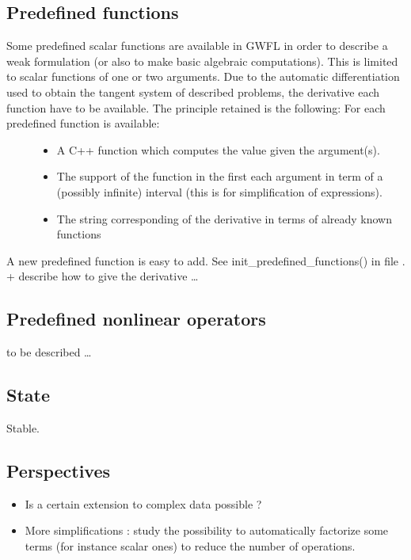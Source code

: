 \documentclass[a4paper,11pt,english]{sphinxmanual}
\begin{document}
\subsection{Predefined functions}
\label{\detokenize{project/libdesc_high_gen_assemb:predefined-functions}}\begin{description}
\item[{Some predefined scalar functions are available in GWFL in order to describe a weak formulation (or also to make basic algebraic computations). This is limited to scalar functions of one or two arguments. Due to the automatic differentiation used to obtain the tangent system of described problems, the derivative each function have to be available. The principle retained is the following: For each predefined function is available:}] \leavevmode\begin{itemize}
\item {} 
A C++ function which computes the value given the argument(s).

\item {} 
The support of the function in the first each argument in term of a
(possibly infinite) interval (this is for simplification of expressions).

\item {} 
The string corresponding of the derivative in terms of already known
functions

\end{itemize}

\end{description}

A new predefined function is easy to add. See init\_predefined\_functions() in file . + describe how to give the derivative …


\subsection{Predefined nonlinear operators}
\label{\detokenize{project/libdesc_high_gen_assemb:predefined-nonlinear-operators}}
to be described …


\subsection{State}
\label{\detokenize{project/libdesc_high_gen_assemb:state}}
Stable.


\subsection{Perspectives}
\label{\detokenize{project/libdesc_high_gen_assemb:perspectives}}\begin{itemize}
\item {} 
Is a certain extension to complex data possible ?

\item {} 
More simplifications : study the possibility to automatically factorize some terms (for instance scalar ones) to reduce the number of operations.

\end{itemize}
\end{document}
